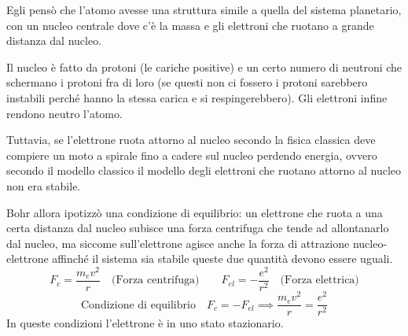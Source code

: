 Egli pensò che l'atomo avesse una struttura simile a quella del sistema planetario, con un nucleo centrale dove c'è la massa e gli elettroni che ruotano a grande distanza dal nucleo.

Il nucleo è fatto da protoni (le cariche positive) e un certo numero di neutroni che schermano i protoni fra di loro (se questi non ci fossero i protoni sarebbero instabili perché hanno la stessa carica e si respingerebbero). Gli elettroni infine rendono neutro l'atomo.

Tuttavia, se l'elettrone ruota attorno al nucleo secondo la fisica classica deve compiere un moto a spirale fino a cadere sul nucleo perdendo energia, ovvero secondo il modello classico il modello degli elettroni che ruotano attorno al nucleo non era stabile.

Bohr allora ipotizzò una condizione di equilibrio: un elettrone che ruota a una certa distanza dal nucleo subisce una forza centrifuga che tende ad allontanarlo dal nucleo, ma siccome sull'elettrone agisce anche la forza di attrazione nucleo-elettrone affinché il sistema sia stabile queste due quantità devono essere uguali.
$$F_c=\frac{m_ev^2}{r} \quad \text{(Forza centrifuga)} \qquad F_{el}=-\frac{e^2}{r^2} \quad \text{(Forza elettrica)}$$
$$\text{Condizione di equilibrio} \quad F_c=-F_{el} \implies \frac{m_ev^2}{r}=\frac{e^2}{r^2}$$
In queste condizioni l'elettrone è in uno stato stazionario.

